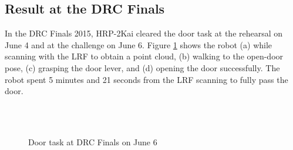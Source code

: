 \subsection{Result at the DRC Finals}
%
In the DRC Finals 2015, HRP-2Kai cleared the door task at the rehearsal on June 4 and at the challenge on June 6.
Figure \ref{fig:drc_door_aist_day2} shows the robot (a) while scanning with the LRF to
obtain a point cloud, (b) walking to the open-door pose, (c) grasping the door lever,
and (d) opening the door successfully.
The robot spent 5 minutes and 21 seconds from the LRF scanning to fully pass the door.
%
\begin{figure}[t]
	\centering
	\quad
	\\
	\quad
	\\
	\caption{Door task at DRC Finals on June 6~\cite{DARPA}}
	\label{fig:drc_door_aist_day2}
\end{figure}


